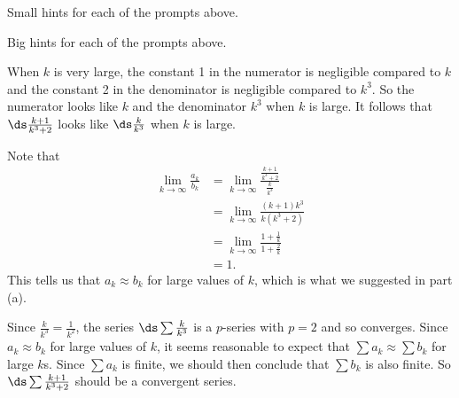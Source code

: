 \begin{smallhint}
\ba
	\item Small hints for each of the prompts above.
\ea
\end{smallhint}
\begin{bighint}
\ba
	\item Big hints for each of the prompts above.
\ea
\end{bighint}
\begin{activitySolution}
\ba
	\item When $k$ is very large, the constant 1 in the numerator is negligible compared to $k$ and the constant 2 in the denominator is negligible compared to $k^3$. So the numerator looks like $k$ and the denominator $k^3$ when $k$ is large. It follows that $\ds \frac{k+1}{k^3+2}$ looks like $\ds \frac{k}{k^3}$ when $k$ is large.
    \item Note that 
    \begin{align*}
    \lim_{k \to \infty} \frac{a_k}{b_k} &= \lim_{k \to \infty} \frac{ \frac{k+1}{k^3+2} }{ \frac{k}{k^3} } \\
        &= \lim_{k \to \infty} \frac{(k+1)k^3}{k(k^3+2)} \\
        &= \lim_{k \to \infty} \frac{1+\frac{1}{k}}{1+\frac{2}{k}} \\
        &= 1.
    \end{align*}
    This tells us that $a_k \approx b_k$ for large values of $k$, which is what we suggested in part (a). 
    \item Since $\frac{k}{k^3} = \frac{1}{k^2}$, the series $\ds \sum \frac{k}{k^3}$ is a $p$-series with $p=2$ and so converges. Since $a_k \approx b_k$ for large values of $k$, it seems reasonable to expect that $\sum a_k \approx \sum b_k$ for large $k$s. Since $\sum a_k$ is finite, we should then conclude that $\sum b_k$ is also finite. So $\ds \sum \frac{k+1}{k^3+2}$ should be a convergent series. 
\ea
\end{activitySolution}
\aftera 